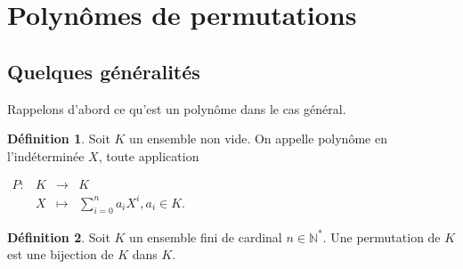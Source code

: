 \documentclass[12pt]{article}
\theoremstyle{definition}
\newtheorem{definition}{Définition}
\begin{document}
\pagebreak 


\section{Polynômes de permutations}
\subsection{Quelques généralités}
Rappelons d'abord ce qu'est un polynôme dans le cas général.\\ %
\begin{definition} %
Soit $K$ un ensemble non vide. On appelle polynôme en l'indéterminée $X$, toute application
\begin{center}
$
\begin{array}{l|rcl}
\displaystyle
P : & K & \longrightarrow & K \\
    & X & \longmapsto & \sum_{i=0}^n a_iX^i,  a_i \in K.
\end{array}
$
\end{center}
\end{definition}

\begin{definition}
Soit $K$ un ensemble fini de cardinal $n\in \mathbb{N}^*$. Une permutation de $K$ est une bijection de $K$ dans $K$.
\end{definition}
\end{document}
